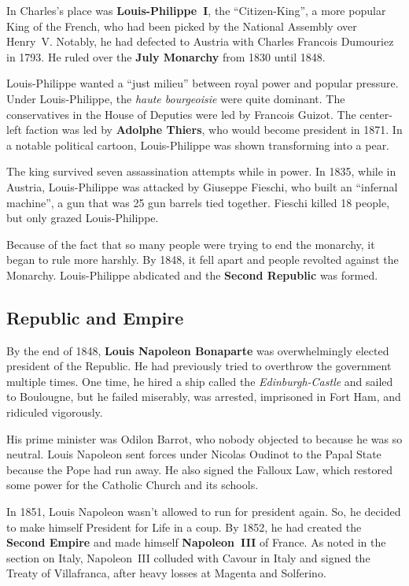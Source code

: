 In Charles's place was \textbf{Louis-Philippe~I}, the ``Citizen-King'', a more popular King of the French,
who had been picked by the National Assembly over Henry~V.
Notably, he had defected to Austria with Charles Francois Dumouriez in 1793.
He ruled over the \textbf{July Monarchy} from 1830 until 1848.

Louis-Philippe wanted a ``just milieu'' between royal power and popular pressure.
Under Louis-Philippe, the \textit{haute bourgeoisie} were quite dominant.
The conservatives in the House of Deputies were led by Francois Guizot.
The center-left faction was led by \textbf{Adolphe Thiers}, who would become president in 1871.
In a notable political cartoon, Louis-Philippe was shown transforming into a pear.

The king survived seven assassination attempts while in power.
In 1835, while in Austria, Louis-Philippe was attacked by Giuseppe Fieschi, who built an ``infernal machine'',
a gun that was 25 gun barrels tied together.
Fieschi killed 18 people, but only grazed Louis-Philippe.

Because of the fact that so many people were trying to end the monarchy, it began to rule more harshly.
By 1848, it fell apart and people revolted against the Monarchy.
Louis-Philippe abdicated and the \textbf{Second Republic} was formed.

\subsection*{Republic and Empire}

By the end of 1848, \textbf{Louis Napoleon Bonaparte} was overwhelmingly elected president of the Republic.
He had previously tried to overthrow the government multiple times.
One time, he hired a ship called the \textit{Edinburgh-Castle} and sailed to Boulougne,
but he failed miserably, was arrested, imprisoned in Fort Ham, and ridiculed vigorously.

His prime minister was Odilon Barrot, who nobody objected to because he was so neutral.
Louis Napoleon sent forces under Nicolas Oudinot to the Papal State because the Pope had run away.
He also signed the Falloux Law, which restored some power for the Catholic Church and its schools.

In 1851, Louis Napoleon wasn't allowed to run for president again.
So, he decided to make himself President for Life in a coup.
By 1852, he had created the \textbf{Second Empire} and made himself \textbf{Napoleon~III} of France.
As noted in the section on Italy, Napoleon~III colluded with Cavour in Italy and signed the Treaty of Villafranca,
after heavy losses at Magenta and Solferino.

